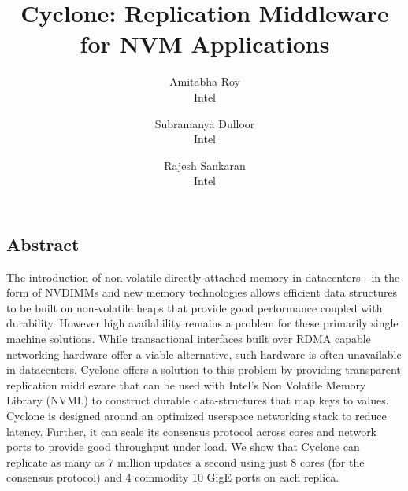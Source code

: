 \documentclass[letterpaper,twocolumn,10pt]{article}
\begin{document}
\date{}

\title{\Large \bf Cyclone: Replication Middleware for NVM Applications}

\author{
  {\rm Amitabha Roy}\\
  Intel
   \and
  {\rm Subramanya Dulloor}\\
  Intel
  \and
  {\rm Rajesh Sankaran}\\
  Intel
} %

\maketitle


\subsection*{Abstract}
The introduction of non-volatile directly attached memory in datacenters - in
the form of NVDIMMs and new memory technologies allows efficient data structures
to be built on non-volatile heaps that provide good performance coupled with
durability. However high availability remains a problem for these primarily
single machine solutions. While transactional interfaces built over RDMA capable
networking hardware offer a viable alternative, such hardware is often
unavailable in datacenters. Cyclone offers a solution to this problem by
providing transparent replication middleware that can be used with Intel's Non
Volatile Memory Library (NVML) to construct durable data-structures that map
keys to values.  Cyclone is designed around an optimized userspace networking
stack to reduce latency. Further, it can scale its consensus protocol across
cores and network ports to provide good throughput under load. We show that
Cyclone can replicate as many as 7 million updates a second using just 8 cores
(for the consensus protocol) and 4 commodity 10 GigE ports on each replica.
\end{document}
